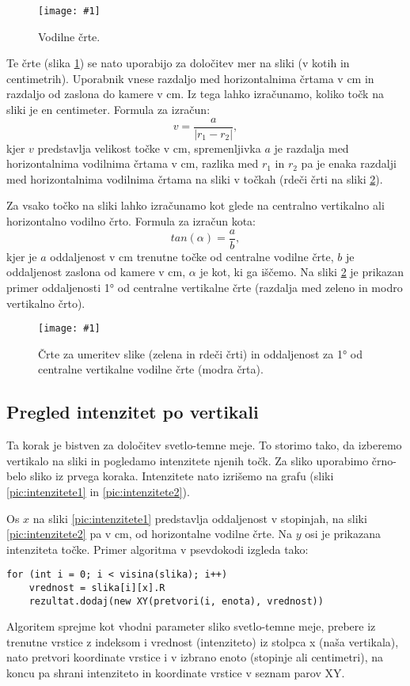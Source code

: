 \documentclass[oneside, a4paper, 12pt]{book}
\newcommand{\slika}[3]{
	\begin{figure}
	\begin{center}
	\texttt{[image: \#1]}
	\end{center}
	\vspace{-20pt}
	\caption{#2}
	\label{#3}
	\end{figure}
}
\begin{document}
\slika{slike/vodilne-crte.jpg}{Vodilne črte.}{pic:vodilne-crte}

Te črte (slika \ref{pic:vodilne-crte}) se nato uporabijo za določitev mer na sliki (v kotih in centimetrih). Uporabnik vnese razdaljo med horizontalnima črtama v cm in razdaljo od zaslona do kamere v cm. Iz tega lahko izračunamo, koliko točk na sliki je en centimeter. Formula za izračun:
\begin{equation}
v=\dfrac{a}{|r_1-r_2|},
\end{equation}
kjer $v$ predstavlja velikost točke v cm, spremenljivka $a$ je razdalja med horizontalnima vodilnima črtama v cm, razlika med $r_1$ in $r_2$ pa je enaka razdalji med horizontalnima vodilnima črtama na sliki v točkah (rdeči črti na sliki \ref{pic:vodilne-mere}). 

Za vsako točko na sliki lahko izračunamo kot glede na centralno vertikalno ali horizontalno vodilno črto. Formula za izračun kota:
\begin{equation}
tan(\alpha)=\dfrac{a}{b},
\end{equation}
kjer je $a$ oddaljenost v cm trenutne točke od centralne vodilne črte, $b$ je oddaljenost zaslona od kamere v cm, $\alpha$ je kot, ki ga iščemo. Na sliki \ref{pic:vodilne-mere} je prikazan primer oddaljenosti 1° od centralne vertikalne črte (razdalja med zeleno in modro vertikalno črto).

\slika{slike/vodilne-mere.jpg}{Črte za umeritev slike (zelena in rdeči črti) in oddaljenost za 1° od centralne vertikalne vodilne črte (modra črta).}{pic:vodilne-mere}

\subsection{Pregled intenzitet po vertikali}
Ta korak je bistven za določitev svetlo-temne meje. To storimo tako, da izberemo vertikalo na sliki in pogledamo intenzitete njenih točk. Za sliko uporabimo črno-belo sliko iz prvega koraka. Intenzitete nato izrišemo na grafu (sliki \ref{pic:intenzitete1} in \ref{pic:intenzitete2}).

Os $x$ na sliki \ref{pic:intenzitete1} predstavlja oddaljenost v stopinjah, na sliki \ref{pic:intenzitete2} pa v cm, od horizontalne vodilne črte. Na $y$ osi je prikazana intenziteta točke. Primer algoritma v psevdokodi izgleda tako:
\begin{samepage}
\begin{verbatim}
for (int i = 0; i < visina(slika); i++)
    vrednost = slika[i][x].R
    rezultat.dodaj(new XY(pretvori(i, enota), vrednost))
\end{verbatim}
\end{samepage}
Algoritem sprejme kot vhodni parameter sliko svetlo-temne meje, prebere iz trenutne vrstice z indeksom i vrednost (intenziteto) iz stolpca x (naša vertikala), nato pretvori koordinate vrstice i v izbrano enoto (stopinje ali centimetri), na koncu pa shrani intenziteto in koordinate vrstice v seznam parov XY.
\end{document}
